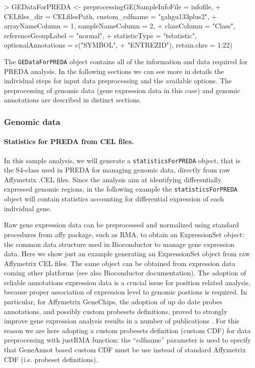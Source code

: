 \documentclass[a4paper,10pt]{article}
\begin{document}
\begin{Schunk}
\begin{Sinput}
> GEDataForPREDA <- preprocessingGE(SampleInfoFile = infofile, 
+     CELfiles_dir = CELfilesPath, custom_cdfname = "gahgu133plus2", 
+     arrayNameColumn = 1, sampleNameColumn = 2, 
+     classColumn = "Class", referenceGroupLabel = "normal", 
+     statisticType = "tstatistic", optionalAnnotations = c("SYMBOL", 
+         "ENTREZID"), retain.chrs = 1:22)
\end{Sinput}
\end{Schunk}

The \texttt{GEDataForPREDA} object contains all of the information and data required for PREDA analysis. In the following sections we can see more in details the individual steps for input data preprocessing and the available options. The preprocessing of genomic data (gene expression data in this case) and genomic annotations are described in distinct sections.



\subsubsection{Genomic data}

\paragraph{Statistics for PREDA from CEL files.} In this sample analysis, we will generate a \texttt{statisticsForPREDA} object, that is the S4-class used in PREDA for managing genomic data, directly from raw Affymetrix .CEL files. Since the analysis aim at identifying differentially expressed genomic regions, in the following example the \texttt{statisticsForPREDA} object will contain statistics accounting for differential expression of each individual gene.

Raw gene expression data can be preprocessed and normalized using standard procedures from affy package, such as RMA, to obtain an ExpressionSet object: the common data structure used in Bioconductor to manage gene expression data. Here we show just an example generating an ExpressionSet object from raw Affymetrix CEL files. The same object can be obtained from expression data coming other platforms (see also Bioconductor documentation). The adoption of reliable annotations expression data is a crucial issue for position related analysis, because proper association of expression level to genomic postions is required. In particular, for Affymetrix GeneChips, the adoption of up do date probes annotations, and possibly custom probesets definitions, proved to strongly improve gene expression analysis results in a number of publications \cite{PubMed_16284200,PubMed_18005434,PubMed_17394657,PubMed_15850491}. For this reason we are here adopting a custom probesets definition (custom CDF) for data preprocessing with justRMA function: the ``cdfname'' parameter is used to specify that GeneAnnot based custom CDF \cite{PubMed_18005434} must be use instead of standard Affymetrix CDF (i.e. probeset definitions).
\end{document}
